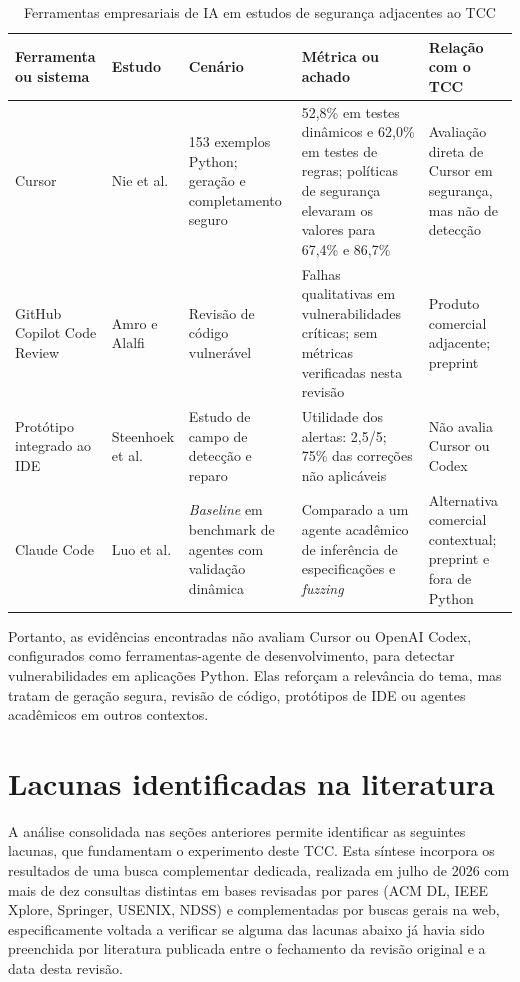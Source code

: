 \begin{table}[htbp]
\centering
\caption{Ferramentas empresariais de IA em estudos de segurança adjacentes ao TCC}\label{tab:ferramentas-empresariais-estudo}
\begin{tabularx}{\textwidth}{|X|X|X|X|X|}
\hline
\textbf{Ferramenta ou sistema} & \textbf{Estudo} & \textbf{Cenário} & \textbf{Métrica ou achado} & \textbf{Relação com o TCC} \\
\hline
Cursor & Nie et al. \cite{Nie2025SecCodePLT} & 153 exemplos Python; geração e completamento seguro & 52,8\% em testes dinâmicos e 62,0\% em testes de regras; políticas de segurança elevaram os valores para 67,4\% e 86,7\% & Avaliação direta de Cursor em segurança, mas não de detecção \\
\hline
GitHub Copilot Code Review & Amro e Alalfi \cite{Amro2025CopilotReview} & Revisão de código vulnerável & Falhas qualitativas em vulnerabilidades críticas; sem métricas verificadas nesta revisão & Produto comercial adjacente; preprint \\
\hline
Protótipo integrado ao IDE & Steenhoek et al. \cite{Steenhoek2025IDEUserStudy} & Estudo de campo de detecção e reparo & Utilidade dos alertas: 2,5/5; 75\% das correções não aplicáveis & Não avalia Cursor ou Codex \\
\hline
Claude Code & Luo et al. \cite{Luo2026CodeAugur} & \textit{Baseline} em benchmark de agentes com validação dinâmica & Comparado a um agente acadêmico de inferência de especificações e \textit{fuzzing} & Alternativa comercial contextual; preprint e fora de Python \\
\hline
\end{tabularx}
\end{table}

Portanto, as evidências encontradas não avaliam Cursor ou OpenAI Codex, configurados como ferramentas-agente de desenvolvimento, para detectar vulnerabilidades em aplicações Python. Elas reforçam a relevância do tema, mas tratam de geração segura, revisão de código, protótipos de IDE ou agentes acadêmicos em outros contextos.


\section{Lacunas identificadas na literatura}\label{sec:lacunas-literatura}
A análise consolidada nas seções anteriores permite identificar as seguintes lacunas, que fundamentam o experimento deste TCC. Esta síntese incorpora os resultados de uma busca complementar dedicada, realizada em julho de 2026 com mais de dez consultas distintas em bases revisadas por pares (ACM DL, IEEE Xplore, Springer, USENIX, NDSS) e complementadas por buscas gerais na web, especificamente voltada a verificar se alguma das lacunas abaixo já havia sido preenchida por literatura publicada entre o fechamento da revisão original e a data desta revisão.

